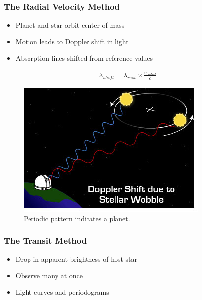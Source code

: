 \documentclass[xetex,mathserif,serif]{beamer}
\begin{document}
\begin{frame}
    \frametitle{The Radial Velocity Method}
    \begin{itemize}[<+->]
        \item Planet and star orbit center of mass
        \item Motion leads to Doppler shift in light
        \item Absorption lines shifted from reference values
    \end{itemize}
    \begin{align*}<4->
        \lambda_{shift} = \lambda_{rest} \times \frac{v_{radial}}{c}
    \end{align*}
\end{frame}

\begin{frame}
    \begin{figure}
        \centering
        \includegraphics[height=0.8\textheight]{images/doppler1}
        \caption{Periodic pattern indicates a planet.}
    \end{figure}
\end{frame}

\begin{frame}
    \frametitle{The Transit Method}
    \begin{itemize}[<+->]
        \item Drop in apparent brightness of host star
        \item Observe many at once
        \item Light curves and periodograms
    \end{itemize}
\end{frame}
\end{document}
